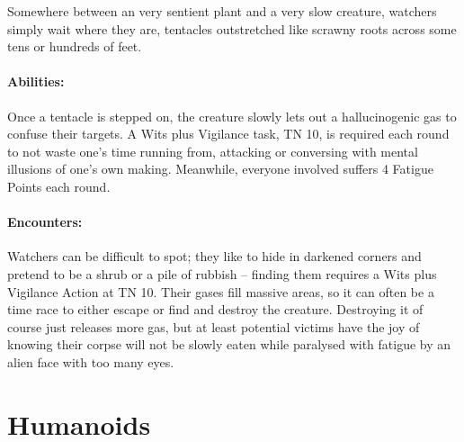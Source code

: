 \begin{multicols}{2}
Somewhere between an very sentient plant and a very slow creature, watchers simply wait where they are, tentacles outstretched like scrawny roots across some tens or hundreds of feet.
\paragraph{Abilities:} Once a tentacle is stepped on, the creature slowly lets out a hallucinogenic gas to confuse their targets.
A Wits plus Vigilance task, TN 10, is required each round to not waste one's time running from, attacking or conversing with mental illusions of one's own making.
Meanwhile, everyone involved suffers 4 Fatigue Points each round.

\paragraph{Encounters:} Watchers can be difficult to spot; they like to hide in darkened corners and pretend to be a shrub or a pile of rubbish -- finding them requires a Wits plus Vigilance Action at TN 10.
Their gases fill massive areas, so it can often be a time race to either escape or find and destroy the creature.
Destroying it of course just releases more gas, but at least potential victims have the joy of knowing their corpse will not be slowly eaten while paralysed with fatigue by an alien face with too many eyes.

\watcher

\end{multicols}

\section{Humanoids}

